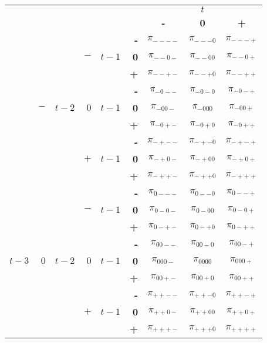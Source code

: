 \documentclass{article}[]
\begin{document}
\newpage

\begin{center}
\begin{tabular}{r | r | r | r | r | r | c c c | }
 \multicolumn{5}{r}{} & \multicolumn{1}{r}{} &	\multicolumn{3}{c}{$t$} \\ \cline{7-9}
 \multicolumn{5}{r}{} & 		& \textbf{-} & \textbf{0} & \textbf{+} \\ \cline{2-2} \cline{4-4} \cline{6-9}
& & &	& &   \textbf{-} & $\pi_{----}$	& $\pi_{---0}$	& $\pi_{---+}$ \\ 
& & &  $-$ &$t-1$ & \textbf{0} & $\pi_{--0-}$	& $\pi_{--00}$	& $\pi_{--0+}$	\\
& &      &   &		&    \textbf{+} & $\pi_{--+-}$	& $\pi_{--+0}$	& $\pi_{--++}$ \\ \cline{4-4} \cline{6-9}
& &      &   &		&    \textbf{-} & $\pi_{-0--}$	& $\pi_{-0-0}$	& $\pi_{-0-+}$ \\ 
& $-$ & $t-2$ & $0$   &$t-1$ & \textbf{0} & $\pi_{-00-}$	& $\pi_{-000}$	& $\pi_{-00+}$	\\
& &      &   &		&    \textbf{+} & $\pi_{-0+-}$	& $\pi_{-0+0}$	& $\pi_{-0++}$ \\  \cline{4-4} \cline{6-9}
& &      &   &		&    \textbf{-} & $\pi_{-+--}$	& $\pi_{-+-0}$	& $\pi_{-+-+}$ \\ 
& & &$+$   &$t-1$ & \textbf{0} & $\pi_{-+0-}$	& $\pi_{-+00}$	& $\pi_{-+0+}$	\\
& &      &   &		&    \textbf{+} & $\pi_{-++-}$	& $\pi_{-++0}$	& $\pi_{-+++}$ \\ \cline{2-2} \cline{4-4} \cline{6-9}

& &     &	&	&    \textbf{-} & $\pi_{0---}$	& $\pi_{0--0}$	& $\pi_{0--+}$ \\ 
& & &  $-$ &$t-1$ & \textbf{0} & $\pi_{0-0-}$	& $\pi_{0-00}$	& $\pi_{0-0+}$	\\
& &      &   &		&    \textbf{+} & $\pi_{0-+-}$	& $\pi_{0-+0}$	& $\pi_{0-++}$ \\ \cline{4-4} \cline{6-9}
& &      &   &		&    \textbf{-} & $\pi_{00--}$	& $\pi_{00-0}$	& $\pi_{00-+}$ \\ 
$t-3$ & $0$ & $t-2$ & $0$   &$t-1$ & \textbf{0} & $\pi_{000-}$	& $\pi_{0000}$	& $\pi_{000+}$	\\
& &      &   &		&    \textbf{+} & $\pi_{00+-}$	& $\pi_{00+0}$	& $\pi_{00++}$ \\ \cline{4-4} \cline{6-9}
& &      &   &		&    \textbf{-} & $\pi_{++--}$	& $\pi_{++-0}$	& $\pi_{++-+}$ \\ 
& & &$+$   &$t-1$ & \textbf{0} & $\pi_{++0-}$	& $\pi_{++00}$	& $\pi_{++0+}$	\\
& &      &   &		&    \textbf{+} & $\pi_{+++-}$	& $\pi_{+++0}$	& $\pi_{++++}$ \\ \cline{2-2} \cline{4-4} \cline{6-9}


\end{tabular}
\end{center}
\end{document}
